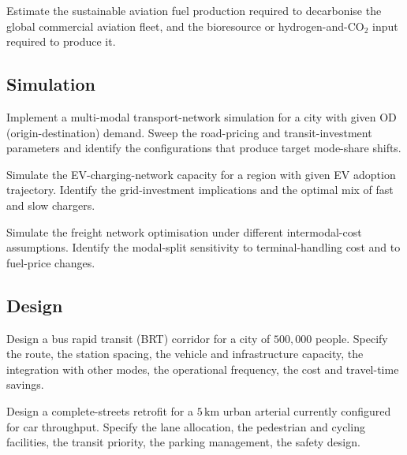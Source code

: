 \begin{exercise}
Estimate the sustainable aviation fuel production required to decarbonise the global commercial aviation fleet, and the bioresource or hydrogen-and-CO$_2$ input required to produce it.
\end{exercise}

\subsection*{Simulation}

\begin{exercise}
Implement a multi-modal transport-network simulation for a city with given OD (origin-destination) demand. Sweep the road-pricing and transit-investment parameters and identify the configurations that produce target mode-share shifts.
\end{exercise}

\begin{exercise}
Simulate the EV-charging-network capacity for a region with given EV adoption trajectory. Identify the grid-investment implications and the optimal mix of fast and slow chargers.
\end{exercise}

\begin{exercise}
Simulate the freight network optimisation under different intermodal-cost assumptions. Identify the modal-split sensitivity to terminal-handling cost and to fuel-price changes.
\end{exercise}

\subsection*{Design}

\begin{exercise}
Design a bus rapid transit (BRT) corridor for a city of $500{,}000$ people. Specify the route, the station spacing, the vehicle and infrastructure capacity, the integration with other modes, the operational frequency, the cost and travel-time savings.
\end{exercise}

\begin{exercise}
Design a complete-streets retrofit for a $5\,\text{km}$ urban arterial currently configured for car throughput. Specify the lane allocation, the pedestrian and cycling facilities, the transit priority, the parking management, the safety design.
\end{exercise}

